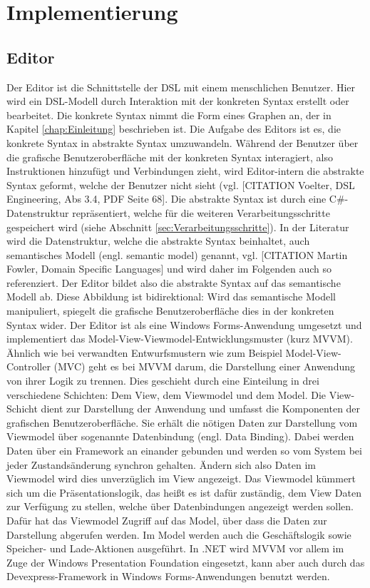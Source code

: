 \chapter{Implementierung}
\label{chap:Implementierung}

\section{Editor}
\label{sec:Editor}
Der Editor ist die Schnittstelle der DSL mit einem menschlichen Benutzer. Hier wird ein DSL-Modell durch Interaktion mit der konkreten Syntax erstellt oder bearbeitet. Die konkrete Syntax nimmt die Form eines Graphen an, der in Kapitel \ref{chap:Einleitung} beschrieben ist. Die Aufgabe des Editors ist es, die konkrete Syntax in abstrakte Syntax umzuwandeln. Während der Benutzer über die grafische Benutzeroberfläche mit der konkreten Syntax interagiert, also Instruktionen hinzufügt und Verbindungen zieht, wird Editor-intern die abstrakte Syntax geformt, welche der Benutzer nicht sieht (vgl. [CITATION Voelter, DSL Engineering, Abs 3.4, PDF Seite 68]. Die abstrakte Syntax ist durch eine C\#-Datenstruktur repräsentiert, welche für die weiteren Verarbeitungsschritte gespeichert wird (siehe Abschnitt \ref{sec:Verarbeitungsschritte}). In der Literatur wird die Datenstruktur, welche die abstrakte Syntax beinhaltet, auch semantisches Modell (engl. semantic model) genannt, vgl. [CITATION Martin Fowler, Domain Specific Languages] und wird daher im Folgenden auch so referenziert. Der Editor bildet also die abstrakte Syntax auf das semantische Modell ab. Diese Abbildung ist bidirektional: Wird das semantische Modell manipuliert, spiegelt die grafische Benutzeroberfläche dies in der konkreten Syntax wider.
\newline
Der Editor ist als eine Windows Forms-Anwendung umgesetzt und implementiert das Model-View-Viewmodel-Entwicklungsmuster (kurz MVVM). Ähnlich wie bei verwandten Entwurfsmustern wie zum Beispiel Model-View-Controller (MVC) geht es bei MVVM darum, die Darstellung einer Anwendung von ihrer Logik zu trennen. Dies geschieht durch eine Einteilung in drei verschiedene Schichten: Dem View, dem Viewmodel und dem Model. Die View-Schicht dient zur Darstellung der Anwendung und umfasst die Komponenten der grafischen Benutzeroberfläche. Sie erhält die nötigen Daten zur Darstellung vom Viewmodel über sogenannte Datenbindung (engl. Data Binding). Dabei werden Daten über ein Framework an einander gebunden und werden so vom System bei jeder Zustandsänderung synchron gehalten. Ändern sich also Daten im Viewmodel wird dies unverzüglich im View angezeigt. Das Viewmodel kümmert sich um die Präsentationslogik, das heißt es ist dafür zuständig, dem View Daten zur Verfügung zu stellen, welche über Datenbindungen angezeigt werden sollen. Dafür hat das Viewmodel Zugriff auf das Model, über dass die Daten zur Darstellung abgerufen werden. Im Model werden auch die Geschäftslogik sowie Speicher- und Lade-Aktionen ausgeführt. In .NET wird MVVM vor allem im Zuge der Windows Presentation Foundation eingesetzt, kann aber auch durch das Devexpress-Framework in Windows Forms-Anwendungen benutzt werden.
